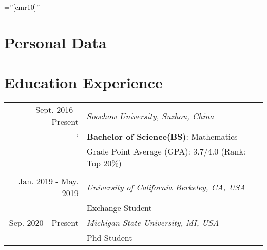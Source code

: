 \documentclass[a4paper,10pt,utf8]{article} %
\begin{document}
\pagestyle{empty} %
\font\fb=''[cmr10]'' %

\par{\bigskip\par} %
\par{\bigskip\par}

\section{Personal Data}
\begin{table}[ht]
\end{table}


\section{Education Experience}

\begin{tabular}{r|p{11cm}}	
Sept. 2016 - Present 					& \textit{Soochow University, Suzhou, China}\\
				`					& \textbf{Bachelor of Science(BS)}: Mathematics\\
									& Grade Point Average (GPA): 3.7/4.0 (Rank: Top 20\%)\\

\multicolumn{2}{c}{} \\	%

Jan. 2019 - May. 2019 					& \textit{University of California Berkeley, CA, USA}\\
          							& Exchange Student  \\
Sep. 2020 - Present 			&\textit{Michigan State University, MI, USA}\\
								& Phd Student         							
\end{tabular}
\end{document}
